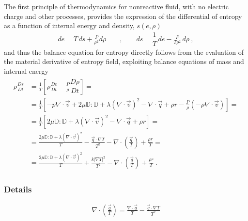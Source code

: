 \documentclass[letterpaper,10pt,english]{jupyterBook}
\begin{document}
\sphinxAtStartPar
{} The first principle of thermodynamics for non\sphinxhyphen{}reactive fluid, with no electric charge and other processes, provides the expression of the differential of entropy as a function of internal energy and density, \(s(e, \rho)\)
\begin{equation*}
\begin{split}d e = T \, ds + \frac{P}{\rho^2} d \rho  \qquad , \qquad ds = \dfrac{1}{T} \, de - \frac{P}{T \rho^2} \, d \rho \ ,\end{split}
\end{equation*}
\sphinxAtStartPar
and thus the balance equation for entropy directly follows from the evaluation of the material derivative of entropy field, exploiting balance equations of mass and internal energy
\begin{equation*}
\begin{split}\begin{aligned}
  \rho \frac{D s}{D t}
  & = \frac{1}{T} \left[ \rho \frac{D e}{D t} - \frac{P}{\rho} \dfrac{D \rho}{D t} \right] = \\
  & = \frac{1}{T} \left[ - p \nabla \cdot \vec{v} + 2 \mu \mathbb{D} : \mathbb{D} + \lambda (\nabla \cdot \vec{v})^2 - \nabla \cdot \vec{q} + \rho r - \frac{P}{\rho} \left( - \rho \nabla \cdot \vec{v} \right) \right] = \\
  & = \frac{1}{T} \left[ 2 \mu \mathbb{D} : \mathbb{D} + \lambda (\nabla \cdot \vec{v})^2 - \nabla \cdot \vec{q} + \rho r \right] = \\
  & = \frac{ 2 \mu \mathbb{D} : \mathbb{D} + \lambda (\nabla \cdot \vec{v})^2}{T} - \frac{\vec{q} \cdot \nabla T}{T^2} - \nabla \cdot \left( \frac{\vec{q}}{T} \right) + \frac{\rho r}{T} = \\
  & = \frac{ 2 \mu \mathbb{D} : \mathbb{D} + \lambda (\nabla \cdot \vec{v})^2}{T} + \frac{k |\nabla T|^2}{T^2} - \nabla \cdot \left( \frac{\vec{q}}{T} \right) + \frac{\rho r}{T} \ .
\end{aligned}\end{split}
\end{equation*}\subsubsection*{Details}
\begin{equation*}
\begin{split}\nabla \cdot \left( \frac{\vec{q}}{T} \right) = \frac{\nabla \cdot \vec{q}}{T} - \frac{\vec{q} \cdot \nabla T}{T^2}\end{split}
\end{equation*}
\end{document}
